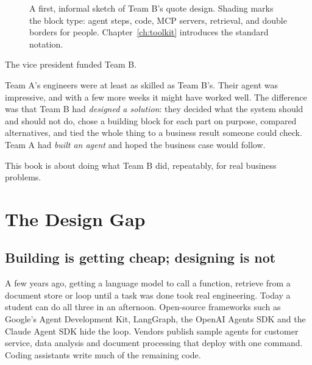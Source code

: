 \begin{figure}[htbp]
\caption{A first, informal sketch of Team B's quote design. Shading marks the block type: agent steps, code, MCP servers, retrieval, and double borders for people. Chapter~\ref{ch:toolkit} introduces the standard notation.}
\label{fig:quote-sketch}
\end{figure}

The vice president funded Team B.

Team A's engineers were at least as skilled as Team B's. Their agent was impressive, and with a few more weeks it might have worked well. The difference was that Team B had \emph{designed a solution}: they decided what the system should and should not do, chose a building block for each part on purpose, compared alternatives, and tied the whole thing to a business result someone could check. Team A had \emph{built an agent} and hoped the business case would follow.

This book is about doing what Team B did, repeatably, for real business problems.

\section{The Design Gap}
\label{sec:design-gap}

\subsection{Building is getting cheap; designing is not}

A few years ago, getting a language model to call a function, retrieve from a document store or loop until a task was done took real engineering. Today a student can do all three in an afternoon. Open-source frameworks such as Google's Agent Development Kit, LangGraph, the OpenAI Agents SDK and the Claude Agent SDK hide the loop. Vendors publish sample agents for customer service, data analysis and document processing that deploy with one command. Coding assistants write much of the remaining code.

